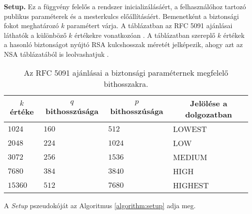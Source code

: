 \begin{outdentlist}
    \item[]\textbf{Setup.}
    Ez a függvény felelős a rendszer inicializálásáért, a felhasználóhoz tartozó publikus paraméterek és a mesterkulcs előállításáért. Bemenetként a biztonsági fokot meghatározó $k$ paramétert várja. A  táblázatban az RFC 5091 ajánlásai láthatók a különböző $k$ értékekre vonatkozóan \cite{RFC5091}. A táblázatban szereplő $k$ értékek a hasonló biztonságot nyújtó RSA kulcshosszak méretét jelképezik, ahogy azt az NSA táblázatából is leolvashatjuk \cite{NSA::EllipticCurve}.

    \begin{table}[H]
        \centering
        \begin{tabular}{|l|l|l|l|}
            \hline
            \multicolumn{1}{|c|}{\textbf{$k$ értéke}} & \multicolumn{1}{c|}{\textbf{$q$ bithosszúsága}} & \multicolumn{1}{c|}{\textbf{$p$ bithosszúsága}} & \multicolumn{1}{c|}{\textbf{Jelölése a dolgozatban}}\\ \hline
            $1024$                           & $160$                                  & $512$                           & LOWEST                                  \\ \hline
            $2048$                           & $224$                                  & $1024$                           & LOW                                 \\ \hline
            $3072$                           & $256$                                  & $1536$                           & MEDIUM                                 \\ \hline
            $7680$                           & $384$                                  & $3840$                           & HIGH                                 \\ \hline
            $15360$                          & $512$                                  & $7680$                           & HIGHEST                                 \\ \hline
        \end{tabular}
        \caption{Az RFC 5091 ajánlásai a biztonsági paraméternek megfelelő bithosszakra.}
        \label{table::RFC::SecurityParam}
    \end{table}

    A \textit{Setup} pszeudokóját az Algoritmus \ref{algorithm:setup} adja meg.


\end{outdentlist}
